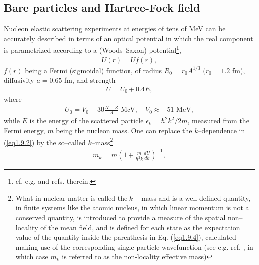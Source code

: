 \subsection{Bare particles and Hartree-Fock field}\label{S1.9.1}
Nucleon elastic scattering experiments at energies of tens of MeV can be accurately described in terms of an optical potential in which the real component is parametrized according to a (Woods--Saxon) potential\footnote{cf. e.g. \cite{Bohr:69} and refs. therein.},
\begin{align}
U(r)=Uf(r),
\end{align}
$f(r)$ being a Fermi (sigmoidal) function, of radius $R_0=r_0A^{1/3}$ $(r_0=1.2$ fm), diffusivity $a=0.65$ fm, and strength 
\begin{align}\label{eq1.9.2}
U=U_0+0.4 E,
\end{align}
where 
\begin{align}\label{eq1.9.3}
U_0=V_0+30\frac{N-Z}{A}\text{ MeV},\quad V_0\approx-51\text{ MeV},
\end{align}
while $E$ is the energy of the scattered particle $\epsilon_k=\hbar^2k^2/2m$, measured from the Fermi energy, $m$ being the nucleon mass. One can replace the $k$--dependence in (\ref{eq1.9.2}) by the so--called $k$--mass\footnote{What in nuclear matter is called the $k-$mass  and is a well defined quantity, in finite systems like the atomic nucleus, in which linear momentum is not
a conserved quantity,  is introduced to provide a measure of the spatial non--locality of the mean field, and is defined for each state 
as the expectation value of the quantity inside the parenthesis in Eq. (\ref{eq1.9.4}), calculated making use of the corresponding single-particle wavefunction 
(see e.g. ref. \cite{Bernard:81}, in which case $m_k$ is referred to as the non-locality effective mass)}
\begin{align}\label{eq1.9.4}
m_k=m\left(1+\frac{m}{\hbar^2k}\frac{dU}{dk}\right)^{-1},
\end{align}
